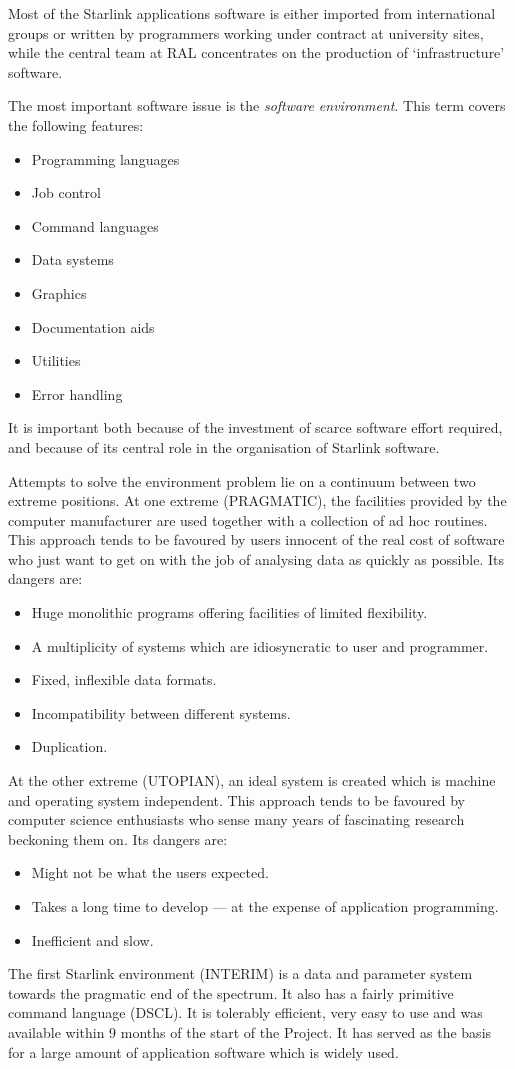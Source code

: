 Most of the Starlink applications software is either imported from
international groups or written by programmers working under contract at
university sites, while the central team at RAL concentrates on the production
of `infrastructure' software.

The most important software issue is the {\em software environment}.
This term covers the following features:
\begin{itemize}
\item Programming languages
\item Job control
\item Command languages
\item Data systems
\item Graphics
\item Documentation aids
\item Utilities
\item Error handling
\end{itemize}
It is important both because of the investment of scarce software effort
required, and because of its central role in the organisation of Starlink
software.

Attempts to solve the environment problem lie on a continuum between two extreme
positions.
At one extreme (PRAGMATIC), the facilities provided by the computer manufacturer
are used together with a collection of ad hoc routines.
This approach tends to be favoured by users innocent of the real cost of
software who just want to get on with the job of analysing data as quickly as
possible.
Its dangers are:
\begin{itemize}
\item Huge monolithic programs offering facilities of limited flexibility.
\item A multiplicity of systems which are idiosyncratic to user and programmer.
\item Fixed, inflexible data formats.
\item Incompatibility between different systems.
\item Duplication.
\end{itemize}
At the other extreme (UTOPIAN), an ideal system is created which is machine and
operating system independent.
This approach tends to be favoured by computer science enthusiasts who sense
many years of fascinating research beckoning them on.
Its dangers are:
\begin{itemize}
\item Might not be what the users expected.
\item Takes a long time to develop --- at the expense of application
programming.
\item Inefficient and slow.
\end{itemize}
The first Starlink environment (INTERIM) is a data and parameter system towards
the pragmatic end of the spectrum.
It also has a fairly primitive command language (DSCL).
It is tolerably efficient, very easy to use and was available within 9 months of
the start of the Project.
It has served as the basis for a large amount of application software which is
widely used.

